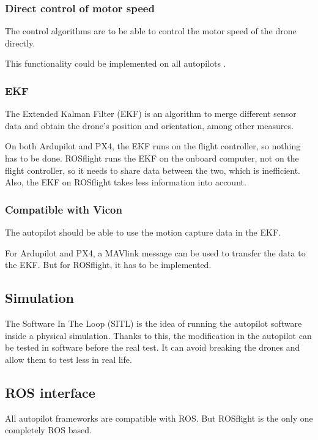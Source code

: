         \subsubsection{Direct control of motor speed}
        The control algorithms are to be able to control the motor speed of the drone directly.

        This functionality could be implemented on all autopilots \cite{github_ardupilot_11859}\cite{px4_low_level_control}\cite{github_rosflight_98}.

        \subsubsection{EKF}
        The Extended Kalman Filter (EKF) is an algorithm to merge different sensor data and obtain the drone's position and orientation, among other measures.
        
        On both Ardupilot and PX4, the EKF runs on the flight controller, so nothing has to be done.
        ROSflight runs the EKF on the onboard computer, not on the flight controller, so it needs to share data between the two, which is inefficient.
        Also, the EKF on ROSflight takes less information into account.

        \subsubsection{Compatible with Vicon}
        The autopilot should be able to use the motion capture data in the EKF.

        For Ardupilot and PX4, a MAVlink message can be used to transfer the data to the EKF.
        But for ROSflight, it has to be implemented.

    \subsection{Simulation}
    The Software In The Loop (SITL) is the idea of running the autopilot software inside a physical simulation.
    Thanks to this, the modification in the autopilot can be tested in software before the real test.
    It can avoid breaking the drones and allow them to test less in real life.

    \subsection{ROS interface}
    All autopilot frameworks are compatible with ROS. But ROSflight is the only one completely ROS based.

